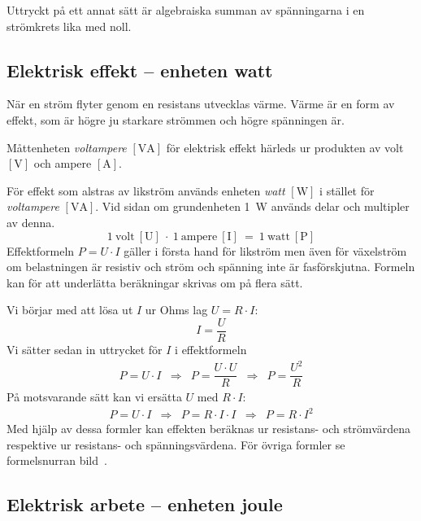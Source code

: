 Uttryckt på ett annat sätt är algebraiska summan av spänningarna i en
strömkrets lika med noll.

\subsection{Elektrisk effekt -- enheten watt}
\label{elektrisk_effekt}

När en ström flyter genom en resistans utvecklas värme.
Värme är en form av effekt, som är högre ju starkare strömmen och högre
spänningen är.

Måttenheten \emph{voltampere} \(\mathrm{[VA]}\) för elektrisk effekt härleds ur
produkten av volt \(\mathrm{[V]}\) och ampere \(\mathrm{[A]}\).

För effekt som alstras av likström används enheten \emph{watt} \(\mathrm{[W]}\)
\cite{SIbrochure8} i stället för \emph{voltampere} \(\mathrm{[VA]}\).
Vid sidan om grundenheten \qty{1}{\watt} används delar och multipler av denna.
\[1\ \mathrm{volt\ [U]}\ \cdot\ 1\ \mathrm{ampere\ [I]}\ =\ 1\ \mathrm{watt\ [P]}\]
Effektformeln \(P = U \cdot I\) gäller i första hand för likström men även för
växelström om belastningen är resistiv och ström och spänning inte är
fasförskjutna.
Formeln kan för att underlätta beräkningar skrivas om på flera sätt.

Vi börjar med att lösa ut $I$ ur Ohms lag $U = R \cdot I$:
\[
I = \dfrac{U}{R}
\]
Vi sätter sedan in uttrycket för $I$ i effektformeln
\[
\begin{array}{lllll}
P=U \cdot I & \Rightarrow & P= \dfrac{U \cdot U}{R} & \Rightarrow & P= \dfrac{U^2}{R}
\end{array}
\]
På motsvarande sätt kan vi ersätta $U$ med $R \cdot I$:
\[
\begin{array}{lllll}
P=U \cdot I & \Rightarrow & P = R \cdot I \cdot I  & \Rightarrow & P = R \cdot I^2
\end{array}
\]
Med hjälp av dessa formler kan effekten beräknas ur resistans- och strömvärdena
respektive ur resistans- och spänningsvärdena.
För övriga formler se formelsnurran bild~.

\subsection{Elektrisk arbete -- enheten joule}

